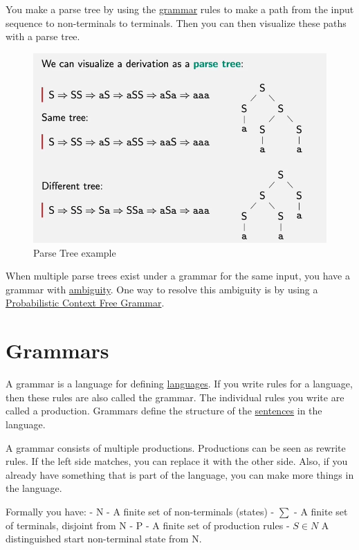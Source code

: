 \documentclass[
  11pt,
  british,
]{article}
\begin{document}
You make a parse tree by using the \href{Grammar.md}{grammar} rules to
make a path from the input sequence to non-terminals to terminals. Then
you can then visualize these paths with a parse tree.

\begin{figure}
\centering
\includegraphics{Pasted_image_20211127140252.png}
\caption{Parse Tree example}
\end{figure}

When multiple parse trees exist under a grammar for the same input, you
have a grammar with \href{Ambiguity.md}{ambiguity}. One way to resolve
this ambiguity is by using a
\href{Probabilistic\%20Context\%20Free\%20Grammar.md}{Probabilistic
Context Free Grammar}.

\hypertarget{grammars}{%
\section{Grammars}\label{grammars}}

A grammar is a language for defining \href{../Languages.md}{languages}.
If you write rules for a language, then these rules are also called the
grammar. The individual rules you write are called a production.
Grammars define the structure of the
\href{../Data/Sentences.md}{sentences} in the language.

A grammar consists of multiple productions. Productions can be seen as
rewrite rules. If the left side matches, you can replace it with the
other side. Also, if you already have something that is part of the
language, you can make more things in the language.

Formally you have: - N - A finite set of non-terminals (states) -
\(\sum\limits\) - A finite set of terminals, disjoint from N - P - A
finite set of production rules - \(S \in N\) A distinguished start
non-terminal state from N.
\end{document}
